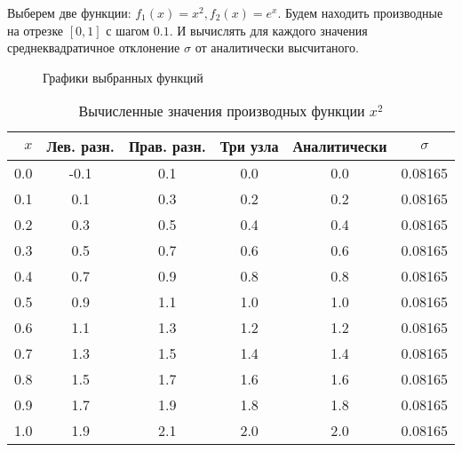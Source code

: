 \documentclass{article}
\begin{document}
\def\Fi{x^2}
\def\Fii{e^x}

Выберем две функции: $f_1(x) = \Fi, f_2(x) = \Fii$. Будем находить производные
на отрезке $[0, 1]$ с шагом $0.1$. И вычислять для каждого значения среднеквадратичное отклонение $\sigma$ от аналитически высчитаного.

\begin{figure}[htpb]
    \begin{center}
    \end{center}
    \caption{Графики выбранных функций}%
\end{figure}

\begin{table}[htp]
    \centering
    \caption{Вычисленные значения производных функции $\Fi$}
    \label{tab:Fi}
    \begin{tabular}{r|c|c|c|c|c}
        $x$ & Лев. разн. & Прав. разн. & Три узла & Аналитически & $\sigma$ \\
        \hline
        0.0 & -0.1 & 0.1 & 0.0 & 0.0 & 0.08165 \\
        0.1 & 0.1 & 0.3 & 0.2 & 0.2 & 0.08165 \\
        0.2 & 0.3 & 0.5 & 0.4 & 0.4 & 0.08165 \\
        0.3 & 0.5 & 0.7 & 0.6 & 0.6 & 0.08165 \\
        0.4 & 0.7 & 0.9 & 0.8 & 0.8 & 0.08165 \\
        0.5 & 0.9 & 1.1 & 1.0 & 1.0 & 0.08165 \\
        0.6 & 1.1 & 1.3 & 1.2 & 1.2 & 0.08165 \\
        0.7 & 1.3 & 1.5 & 1.4 & 1.4 & 0.08165 \\
        0.8 & 1.5 & 1.7 & 1.6 & 1.6 & 0.08165 \\
        0.9 & 1.7 & 1.9 & 1.8 & 1.8 & 0.08165 \\
        1.0 & 1.9 & 2.1 & 2.0 & 2.0 & 0.08165 \\
        \hline
    \end{tabular}
\end{table}
\end{document}
